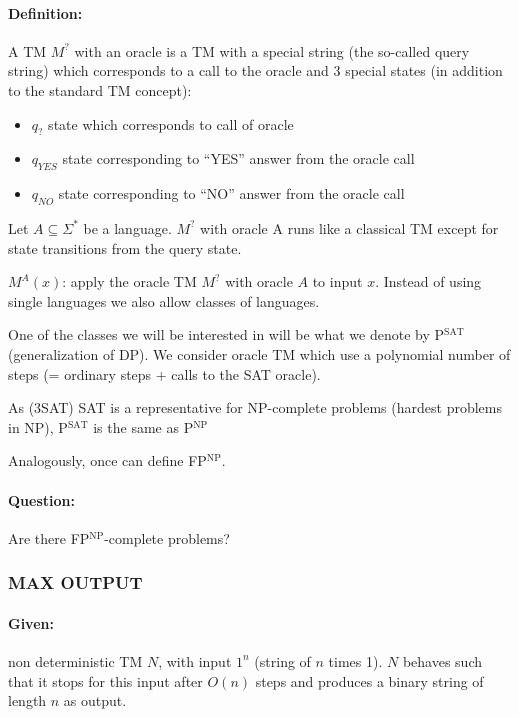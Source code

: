 \documentclass[11pt]{article}
\theoremstyle{definition}
\theoremstyle{definition}
\begin{document}
\paragraph{Definition:} A TM $M^?$ with an oracle is a TM with a special string (the so-called query string) which corresponds to a call to the oracle and 3 special states (in addition to the standard TM concept):
\begin{itemize}
\item $ q_? $ state which corresponds to call of oracle
\item $ q_{YES} $ state corresponding to ``YES'' answer from the oracle call
\item $ q_{NO} $ state corresponding to ``NO'' answer from the oracle call
\end{itemize}

Let $ A \subseteq \Sigma ^\ast $ be a language. $M^? $ with oracle A runs like a classical TM except for state transitions from the query state.

$ M^A(x)$: apply the oracle TM $M^?$ with oracle $ A $ to input $ x $. Instead of using single languages we also allow classes of languages.

One of the classes we will be interested in will be what we denote by P$^\text{SAT}$ (generalization of DP). We consider oracle TM which use a polynomial number of steps (= ordinary steps + calls to the SAT oracle).

As (3SAT) SAT is a representative for NP-complete problems (hardest problems in NP), P$^\text{SAT}$ is the same as P$^\text{NP}$

Analogously, once can define FP$^\text{NP}$.

\paragraph{Question:} Are there FP$^\text{NP}$-complete problems?

\subsubsection{MAX OUTPUT}

\paragraph{Given:} non deterministic TM $ N $, with input $ 1^n $ (string of $ n $ times 1). $ N $ behaves such that it stops for this input after $ O(n) $ steps and produces a binary string of length $ n $ as output.
\end{document}
